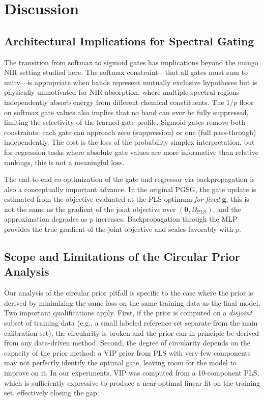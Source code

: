 \documentclass[preprint,12pt,hidelinks]{elsarticle}
\begin{document}
\section{Discussion}

\subsection{Architectural Implications for Spectral Gating}

The transition from softmax to sigmoid gates has implications beyond the
mango NIR setting studied here. The softmax constraint---that all gates
must sum to unity---is appropriate when bands represent mutually exclusive
hypotheses but is physically unmotivated for NIR absorption, where multiple
spectral regions independently absorb energy from different chemical
constituents. The $1/p$ floor on softmax gate values also implies that no
band can ever be fully suppressed, limiting the selectivity of the learned
gate profile. Sigmoid gates remove both constraints: each gate can approach
zero (suppression) or one (full pass-through) independently. The cost is
the loss of the probability simplex interpretation, but for regression
tasks where absolute gate values are more informative than relative rankings,
this is not a meaningful loss.

The end-to-end co-optimization of the gate and regressor via backpropagation
is also a conceptually important advance. In the original PGSG, the gate
update is estimated from the objective evaluated at the PLS optimum
\emph{for fixed} $\mathbf{g}$; this is not the same as the gradient of the
joint objective over $(\boldsymbol{\theta}, \Omega_\mathrm{PLS})$, and
the approximation degrades as $p$ increases. Backpropagation through the
MLP provides the true gradient of the joint objective and scales favorably
with $p$.

\subsection{Scope and Limitations of the Circular Prior Analysis}

Our analysis of the circular prior pitfall is specific to the case where
the prior is derived by minimizing the same loss on the same training data
as the final model. Two important qualifications apply. First, if the prior
is computed on a \emph{disjoint} subset of training data (e.g., a
small labeled reference set separate from the main calibration set), the
circularity is broken and the prior can in principle be derived from any
data-driven method. Second, the degree of circularity depends on the
capacity of the prior method: a VIP prior from PLS with very few components
may not perfectly identify the optimal gate, leaving room for the model to
improve on it. In our experiments, VIP was computed from a 10-component PLS,
which is sufficiently expressive to produce a near-optimal linear fit on
the training set, effectively closing the gap.
\end{document}
